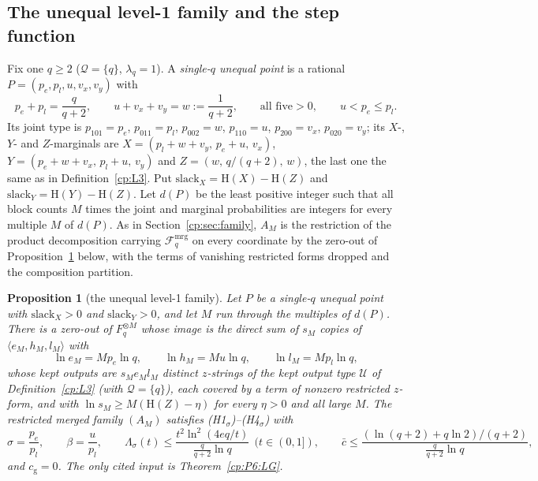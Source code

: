 \documentclass[11pt]{article}
\newtheorem{proposition}[theorem]{Proposition}
\theoremstyle{definition}
\theoremstyle{remark}
\newcommand{\Ent}{\mathrm{H}}                 %
\newcommand{\mat}[3]{\langle #1,#2,#3\rangle} %
\newcommand{\Lam}{\Lambda}                    %
\newcommand{\cg}{c_{\mathrm g}}               %
\newcommand{\cbar}{\bar c}                    %
\newcommand{\Hscond}[1]{\textup{(H#1$_\sigma$)}} %
\newcommand{\Qs}{\mathcal{Q}}                 %
\newcommand{\slack}{\mathrm{slack}}           %
\newcommand{\Ukept}{\mathcal{U}}              %
\newcommand{\Fmrg}{\mathcal{F}^{\mathrm{mrg}}_q} %
\begin{document}
\subsection{The unequal level-1 family and the step function}\label{cp:sec:unequal-level1}

Fix one $q\ge2$ ($\Qs=\{q\}$, $\lambda_q=1$). A \emph{single-$q$ unequal point} is a rational $P=(p_e,p_l,u,v_x,v_y)$ with
\[
p_e+p_l=\frac q{q+2},\qquad u+v_x+v_y=w:=\frac1{q+2},\qquad\text{all five}>0,\qquad u<p_e\le p_l .
\]
Its joint type is $p_{101}=p_e$, $p_{011}=p_l$, $p_{002}=w$, $p_{110}=u$, $p_{200}=v_x$, $p_{020}=v_y$; its $X$-, $Y$- and $Z$-marginals are $X=(p_l+w+v_y,\,p_e+u,\,v_x)$, $Y=(p_e+w+v_x,\,p_l+u,\,v_y)$ and $Z=(w,\,q/(q+2),\,w)$, the last one the same as in Definition~\ref{cp:L3}. Put $\slack_X=\Ent(X)-\Ent(Z)$ and $\slack_Y=\Ent(Y)-\Ent(Z)$. Let $d(P)$ be the least positive integer such that all block counts $M$ times the joint and marginal probabilities are integers for every multiple $M$ of $d(P)$. As in Section~\ref{cp:sec:family}, $A_M$ is the restriction of the product decomposition carrying $\Fmrg$ on every coordinate by the zero-out of Proposition~\ref{cp:E6} below, with the terms of vanishing restricted forms dropped and the composition partition.

\begin{proposition}[the unequal level-1 family]\label{cp:E6}
Let $P$ be a single-$q$ unequal point with $\slack_X>0$ and $\slack_Y>0$, and let $M$ run through the multiples of $d(P)$. There is a zero-out of $F_q^{\otimes M}$ whose image is the direct sum of $s_M$ copies of $\mat{e_M}{h_M}{l_M}$ with
\[
\ln e_M=Mp_e\ln q,\qquad\ln h_M=Mu\ln q,\qquad\ln l_M=Mp_l\ln q,
\]
whose kept outputs are $s_Me_Ml_M$ distinct $z$-strings of the kept output type $\Ukept$ of Definition~\ref{cp:L3} (with $\Qs=\{q\}$), each covered by a term of nonzero restricted $z$-form, and with $\ln s_M\ge M(\Ent(Z)-\eta)$ for every $\eta>0$ and all large $M$. The restricted merged family $(A_M)$ satisfies \Hscond1--\Hscond4{} with
\[
\sigma=\frac{p_e}{p_l},\qquad\beta=\frac u{p_l},\qquad\Lam_\sigma(t)\le\frac{t^2\ln^2(4eq/t)}{\frac q{q+2}\ln q}\ \ (t\in(0,1]),\qquad\cbar\le\frac{(\ln(q+2)+q\ln2)/(q+2)}{\frac q{q+2}\ln q},
\]
and $\cg=0$. The only cited input is Theorem~\ref{cp:P6:LG}.
\end{proposition}
\end{document}
